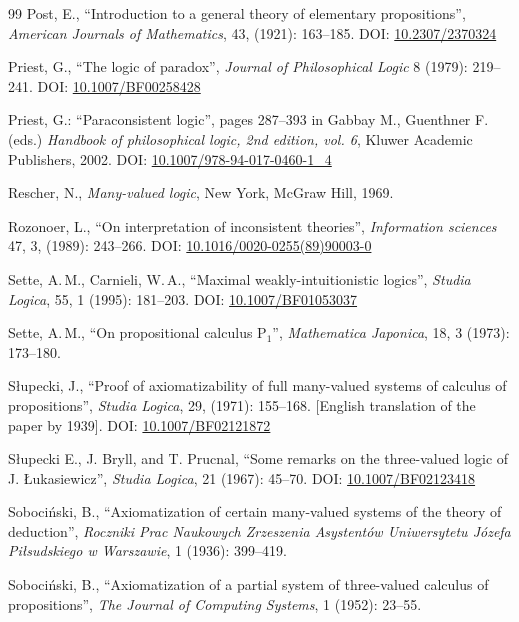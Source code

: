 \documentclass[11pt,a4paper,titlepage]{article}
\theoremstyle{definition}
\newcommand{\3}{\vspace{.3in}}
\newcommand{\2}{\vspace{.2in}}
\newcommand{\1}{\vspace{.1in}}
\newcommand{\5}{\vspace{.05in}}
\newcommand\DOI[2]{DOI: \href{#1#2}{#2}}
\newcommand{\ts}{\,}
\begin{document}
\begin{thebibliography}{99}
Post, E., ``Introduction to a general theory of elementary propositions'', \textit{American Journals of Mathematics}, 43, (1921): 163--185.
\DOI{http://dx.doi.org/}{10.2307/2370324}

Priest, G., ``The logic of paradox'', \textit{Journal of Philosophical Logic} 8 (1979): 219--241.
\DOI{http://dx.doi.org/}{10.1007/BF00258428}

 Priest, G.: ``Paraconsistent logic'', pages 287--393 in Gabbay M., Guenthner F.(eds.) \textit{Handbook of philosophical logic, 2nd edition, vol. 6}, Kluwer Academic Publishers, 2002. 
\DOI{http://dx.doi.org/}{10.1007/978-94-017-0460-1\_4}

Rescher, N.,  \textit{Many-valued logic}, New York, McGraw Hill, 1969.

Rozonoer, L., ``On interpretation of inconsistent theories'', \textit{Information sciences} 47, 3, (1989): 243--266.
\DOI{http://dx.doi.org/}{10.1016/0020-0255(89)90003-0}

Sette, A.\ts M., Carnieli, W.\ts A.,  
``Maximal weakly-intuitionistic logics'', \textit{Studia Logica}, 55, 1 (1995):  181--203.
\DOI{http://dx.doi.org/}{10.1007/BF01053037}

Sette, A.\ts M., ``On propositional calculus P$ _{1} $'', \textit{Mathematica Japonica}, 18, 3 (1973): 173--180.

S\l{}upecki, J.,  ``Proof of axiomatizability of full many-valued systems of calculus of propositions'', \textit{Studia Logica}, 29, (1971): 155--168. [English translation of the paper by 1939]. \DOI{http://dx.doi.org/}{10.1007/BF02121872}


S\l{}upecki E., J. Bryll, and T. Prucnal, ``Some remarks on the three-valued logic of J. \L{}ukasiewicz'', \textit{Studia Logica}, 21 (1967): 45--70.
\DOI{http://dx.doi.org/}{10.1007/BF02123418}

Soboci\'{n}ski, B., ``Axiomatization of certain many-valued systems of the theory of deduction'',  \textit{Roczniki Prac Naukowych Zrzeszenia Asystent\'ow Uniwersytetu J\'ozefa Pi\l sudskiego w Warszawie}, 1 (1936): 399--419.

Soboci\'{n}ski, B., ``Axiomatization of a partial system of three-valued calculus of propositions'', \textit{The Journal of Computing Systems}, 1 (1952): 23--55.


\end{thebibliography}
\end{document}
